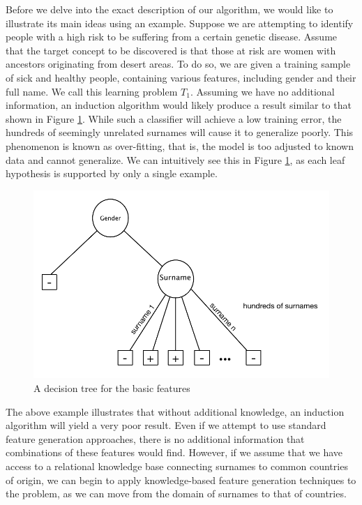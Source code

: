 \documentclass[twoside,11pt]{article}
\theoremstyle{definition}
\begin{document}
Before we delve into the exact description of our algorithm, we would like to illustrate its main ideas using an example.
Suppose we are attempting to identify people with a high risk to be suffering from a certain genetic disease. Assume that the target concept to be discovered is that those at risk are women with ancestors originating from desert areas. To do so, we are given a training sample of sick and healthy people, containing various features, including gender and their full name. We call this learning problem $T_1$.
Assuming we have no additional information, an induction algorithm would likely produce a result similar to that shown in Figure \ref{fig:tree_base}. While such a classifier will achieve a low training error, the hundreds of seemingly unrelated surnames will cause it to generalize poorly. This phenomenon is known as over-fitting, that is, the model is too adjusted to known data and cannot generalize. We can intuitively see this in Figure \ref{fig:tree_base}, as each leaf hypothesis is supported by only a single example.

\begin{figure}
	\centering
	\includegraphics[width=\linewidth]{fig1.pdf}
	\caption{A decision tree for the basic features}
	\label{fig:tree_base}
\end{figure}

The above example illustrates that without additional knowledge, an induction algorithm will yield a very poor result. Even if we attempt to use standard feature generation approaches, there is no additional information that combinations of these features would find.
However, if we assume that we have access to a relational knowledge base connecting surnames to common countries of origin, we can begin to apply knowledge-based feature generation techniques to the problem, as we can move from the domain of surnames to that of countries. 
\end{document}

